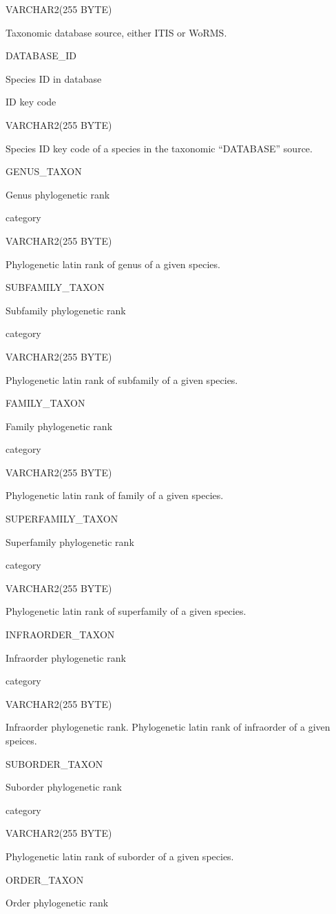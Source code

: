\documentclass[
  letterpaper,
  oneside,
  open=any]{scrbook}
\begin{document}
VARCHAR2(255 BYTE)

Taxonomic database source, either ITIS or WoRMS.

DATABASE\_ID

Species ID in database

ID key code

VARCHAR2(255 BYTE)

Species ID key code of a species in the taxonomic ``DATABASE'' source.

GENUS\_TAXON

Genus phylogenetic rank

category

VARCHAR2(255 BYTE)

Phylogenetic latin rank of genus of a given species.

SUBFAMILY\_TAXON

Subfamily phylogenetic rank

category

VARCHAR2(255 BYTE)

Phylogenetic latin rank of subfamily of a given species.

FAMILY\_TAXON

Family phylogenetic rank

category

VARCHAR2(255 BYTE)

Phylogenetic latin rank of family of a given species.

SUPERFAMILY\_TAXON

Superfamily phylogenetic rank

category

VARCHAR2(255 BYTE)

Phylogenetic latin rank of superfamily of a given species.

INFRAORDER\_TAXON

Infraorder phylogenetic rank

category

VARCHAR2(255 BYTE)

Infraorder phylogenetic rank. Phylogenetic latin rank of infraorder of a
given speices.

SUBORDER\_TAXON

Suborder phylogenetic rank

category

VARCHAR2(255 BYTE)

Phylogenetic latin rank of suborder of a given species.

ORDER\_TAXON

Order phylogenetic rank
\end{document}
